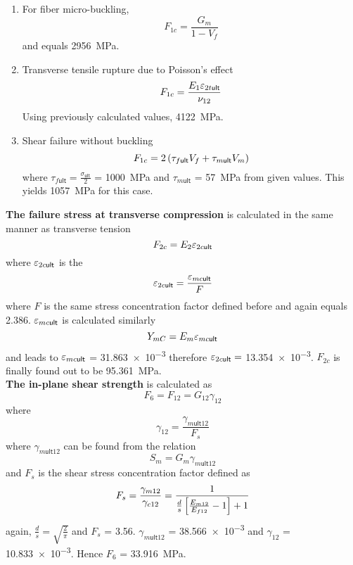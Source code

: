 \documentclass[a4paper,twosided,12pt,DIV12]{scrartcl}
\newcommand{\veps}{\vareps}
\begin{document}
\begin{enumerate}
\item For fiber micro-buckling,
  \begin{equation}
    F_{1c} = \frac{G_m}{1-V_f}
  \end{equation}
  and equals \SI{2956}{MPa}.

\item Transverse tensile rupture due to Poisson's effect
%
  \begin{equation}
    F_{1c} = \frac{E_{1}\veps_{2t\textsf{ult}}}{\nu_{12}}
  \end{equation}
  Using previously calculated values, \SI{4122}{MPa}.

\item Shear failure without buckling
%
  \begin{equation}
    F_{1c} =  2\left(\tau_{f\textsf{ult}}V_f + \tau_{m\textsf{ult}}V_m\right)
  \end{equation}
  where
    $\tau_{f\textsf{ult}} = \frac{\sigma_{\textsf{ult}}}{2}$ = \SI{1000}{MPa}
    and $\tau_{m\textsf{ult}}$ = \SI{57}{MPa} from given values. This yields
    \SI{1057}{MPa} for this case.
\end{enumerate}
%
%
\textbf{The failure stress at transverse compression} is calculated in the same
manner as transverse tension
%
\begin{equation}
  F_{2c} = E_{2} \veps_{2c\textsf{ult}}
\end{equation}
%
where $\veps_{2c\textsf{ult}}$ is the
%
\begin{equation}
  \veps_{2c\textsf{ult}} = \frac{\veps_{mc\textsf{ult}}}{F}
\end{equation}
%
where $F$ is the same stress concentration factor defined before and again
equals 2.386.
$\veps_{mc\textsf{ult}}$ is calculated similarly
%
\begin{equation}
  Y_{mC} = E_m \veps_{mc\textsf{ult}}
\end{equation}
and leads to $\veps_{mc\textsf{ult}}$ = \num{31.863e-3} therefore $\veps_{2c\textsf{ult}}=$
\num{13.354e-3}. $F_{2c}$ is finally found out to be \SI{95.361}{MPa}.
%
\\\textbf{The in-plane shear strength} is calculated as
%
\begin{equation}
  F_6 = F_{12} = G_{12}\gamma_{12}
\end{equation}
%
where
%
\begin{equation}
  \gamma_{12} = \frac{\gamma_{m\textsf{ult}12}}{F_s}
\end{equation}
%
where $\gamma_{m\textsf{ult}12}$ can be found from the relation
%
\begin{equation}
  S_m = G_m \gamma_{m\textsf{ult}12}
\end{equation}
%
and $F_s$ is the shear stress concentration factor defined as
%
\begin{equation}
  F_s = \frac{\gamma_{m12}}{\gamma_{c12}} = \frac{1}{\frac{d}{s}\left[\frac{E_{m12}}{E_{f12}}-1\right]+1}
\end{equation}
%
again, $\frac{d}{s}=\sqrt{\frac{2}{\pi}}$ and $F_s$ = \num{3.56}.
$\gamma_{m\textsf{ult}12}$ = \num{38.566e-3} and $\gamma_{12}$ =
\num{10.833e-3}. Hence $F_6$ = \SI{33.916}{MPa}.
\end{document}
